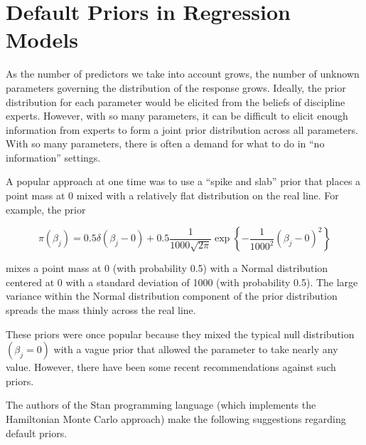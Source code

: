 \documentclass[
  letterpaper,
  DIV=11,
  numbers=noendperiod]{scrreprt}
\theoremstyle{definition}
\theoremstyle{definition}
\theoremstyle{plain}
\theoremstyle{remark}
\begin{document}
\hypertarget{sec-reg-priors}{%
\chapter{Default Priors in Regression Models}\label{sec-reg-priors}}

\providecommand{\norm}[1]{\lVert#1\rVert}
\providecommand{\abs}[1]{\lvert#1\rvert}
\providecommand{\iid}{\stackrel{\text{IID}}{\sim}}
\providecommand{\ind}{\stackrel{\text{Ind}}{\sim}}

\providecommand{\bm}[1]{\mathbf{#1}}
\providecommand{\bs}[1]{\boldsymbol{#1}}
\providecommand{\bbeta}{\bs{\beta}}

\providecommand{\Ell}{\mathcal{L}}
\providecommand{\indep}{\perp\negthickspace\negmedspace\perp}

As the number of predictors we take into account grows, the number of
unknown parameters governing the distribution of the response grows.
Ideally, the prior distribution for each parameter would be elicited
from the beliefs of discipline experts. However, with so many
parameters, it can be difficult to elicit enough information from
experts to form a joint prior distribution across all parameters. With
so many parameters, there is often a demand for what to do in ``no
information'' settings.

A popular approach at one time was to use a ``spike and slab'' prior
that places a point mass at 0 mixed with a relatively flat distribution
on the real line. For example, the prior

\[\pi\left(\beta_j\right) = 0.5 \delta\left(\beta_j - 0\right) + 0.5 \frac{1}{1000 \sqrt{2 \pi}} \exp\left\{-\frac{1}{1000^2} \left(\beta_j - 0 \right)^2\right\}\]

mixes a point mass at 0 (with probability 0.5) with a Normal
distribution centered at 0 with a standard deviation of 1000 (with
probability 0.5). The large variance within the Normal distribution
component of the prior distribution spreads the mass thinly across the
real line.

These priors were once popular because they mixed the typical null
distribution \(\left(\beta_j = 0\right)\) with a vague prior that
allowed the parameter to take nearly any value. However, there have been
some recent recommendations against such priors.

The authors of the Stan programming language (which implements the
Hamiltonian Monte Carlo approach) make the following suggestions
regarding default priors.
\end{document}
